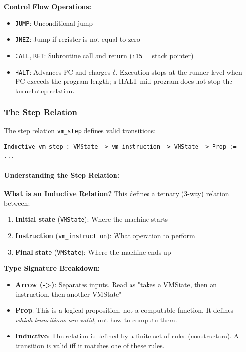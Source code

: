 \textbf{Control Flow Operations:}
\begin{itemize}
    \item \texttt{JUMP}: Unconditional jump
    \item \texttt{JNEZ}: Jump if register is not equal to zero
    \item \texttt{CALL}, \texttt{RET}: Subroutine call and return (\texttt{r15} = stack pointer)
    \item \texttt{HALT}: Advances PC and charges $\delta$. Execution stops at the runner level when PC exceeds the program length; a HALT mid-program does not stop the kernel step relation.
\end{itemize}

\subsubsection{The Step Relation}

The step relation \texttt{vm\_step} defines valid transitions:
\begin{lstlisting}
Inductive vm_step : VMState -> vm_instruction -> VMState -> Prop := ...
\end{lstlisting}

\paragraph{Understanding the Step Relation:}
\textbf{What is an Inductive Relation?} This defines a ternary (3-way) relation between:
\begin{enumerate}
    \item \textbf{Initial state} (\texttt{VMState}): Where the machine starts
    \item \textbf{Instruction} (\texttt{vm\_instruction}): What operation to perform
    \item \textbf{Final state} (\texttt{VMState}): Where the machine ends up
\end{enumerate}

\textbf{Type Signature Breakdown:}
\begin{itemize}
    \item \textbf{Arrow (->)}: Separates inputs. Read as "takes a VMState, then an instruction, then another VMState"
    \item \textbf{Prop}: This is a logical proposition, not a computable function. It defines \emph{which transitions are valid}, not how to compute them.
    \item \textbf{Inductive}: The relation is defined by a finite set of rules (constructors). A transition is valid iff it matches one of these rules.
\end{itemize}

